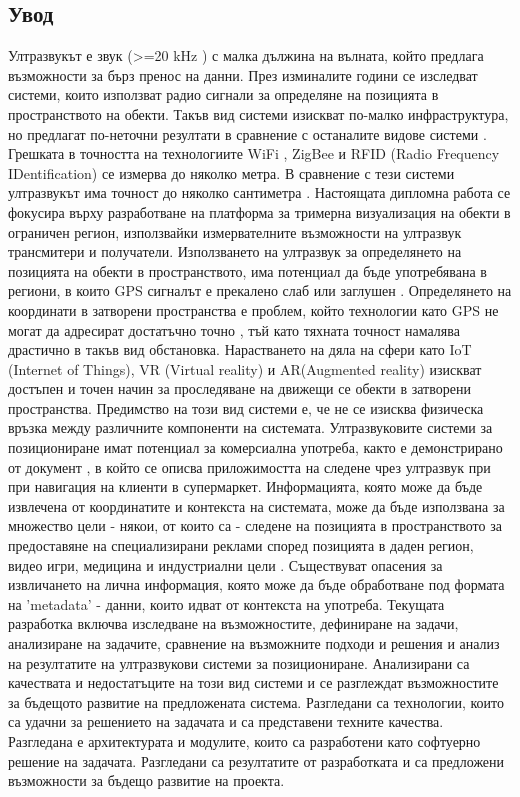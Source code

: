 \subsection{Увод}
\tab Ултразвукът е звук (>=20 kHz \cite{batmobile}) с малка дължина на вълната, който предлага възможности за бърз пренос на данни. През изминалите години се изследват системи, които използват радио сигнали за определяне на позицията в пространството на обекти. Такъв вид системи изискват по-малко инфраструктура, но предлагат по-неточни резултати в сравнение с останалите видове системи \cite{CarlosMedina}. Грешката в точността на технологиите WiFi \cite{wifi}, ZigBee \cite{zigbee} и RFID (Radio Frequency IDentification) \cite{rfid} се измерва до няколко метра. В сравнение с тези системи ултразвукът има точност до няколко сантиметра \cite{CarlosMedina} \cite{columbia}. Настоящата дипломна работа се фокусира върху разработване на платформа за тримерна визуализация на обекти в ограничен регион, използвайки измервателните възможности на ултразвук трансмитери и получатели. Използването на ултразвук за определянето на позицията на обекти в пространството, има потенциал да бъде употребявана в региони, в които GPS сигналът е прекалено слаб или заглушен \cite{yonei}. Определянето на координати в затворени пространства е проблем, който технологии като GPS не могат да адресират достатъчно точно \cite{gpsIsBadIndoor}, тъй като тяхната точност намалява драстично в такъв вид обстановка. Нарастването на дяла на сфери като IoT (Internet of Things), VR (Virtual reality) и AR(Augmented reality) изискват достъпен и точен начин за проследяване на движещи се обекти в затворени пространства. Предимство на този вид системи е, че не се изисква физическа връзка между различните компоненти на системата. Ултразвуковите системи за позициониране имат потенциал за комерсиална употреба, както е демонстрирано от документ \cite{batmobile}, в който се описва приложимостта на следене чрез ултразвук при при навигация на клиенти в супермаркет. Информацията, която може да бъде извлечена от координатите и контекста на системата, може да бъде използвана за множество цели - някои, от които са - следене на позицията в пространството за предоставяне на специализирани реклами според позицията в даден регион, видео игри, медицина и индустриални цели \cite{bristolBeacons}. Съществуват опасения за извличането на лична информация, която може да бъде обработване под формата на 'metadata' - данни, които идват от контекста на употреба. Текущата разработка включва изследване на възможностите, дефиниране на задачи, анализиране на задачите, сравнение на възможните подходи и решения и анализ на резултатите на ултразвукови системи за позициониране. Анализирани са качествата и недостатъците на този вид системи и се разглеждат възможностите за бъдещото развитие на предложената система. Разгледани са технологии, които са удачни за решението на задачата и са представени техните качества. Разгледана е архитектурата и модулите, които са разработени като софтуерно решение на задачата. Разгледани са резултатите от разработката и са предложени възможности за бъдещо развитие на проекта.

